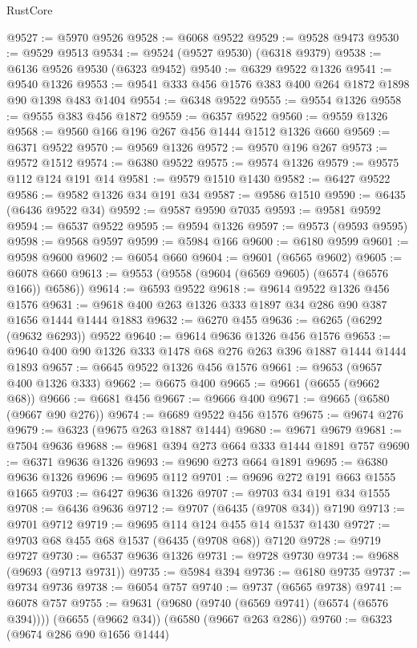 \begin{lexlean}{RustCore}
\begin{coremodule}
@9527 := @5970 @9526
@9528 := @6068 @9522
@9529 := @9528 @9473
@9530 := @9529 @9513
@9534 := @9524 (@9527 @9530) (@6318 @9379)
@9538 := @6136 @9526 @9530 (@6323 @9452)
@9540 := @6329 @9522 @1326
@9541 := @9540 @1326
@9553 := @9541 @333 @456 @1576 @383 @400 @264 @1872 @1898 @90 @1398 @483 @1404
@9554 := @6348 @9522
@9555 := @9554 @1326
@9558 := @9555 @383 @456 @1872
@9559 := @6357 @9522
@9560 := @9559 @1326
@9568 := @9560 @166 @196 @267 @456 @1444 @1512 @1326 @660
@9569 := @6371 @9522
@9570 := @9569 @1326
@9572 := @9570 @196 @267
@9573 := @9572 @1512
@9574 := @6380 @9522
@9575 := @9574 @1326
@9579 := @9575 @112 @124 @191 @14
@9581 := @9579 @1510 @1430
@9582 := @6427 @9522
@9586 := @9582 @1326 @34 @191 @34
@9587 := @9586 @1510
@9590 := @6435 (@6436 @9522 @34)
@9592 := @9587 @9590 @7035
@9593 := @9581 @9592
@9594 := @6537 @9522
@9595 := @9594 @1326
@9597 := @9573 (@9593 @9595)
@9598 := @9568 @9597
@9599 := @5984 @166
@9600 := @6180 @9599
@9601 := @9598 @9600
@9602 := @6054 @660
@9604 := @9601 (@6565 @9602)
@9605 := @6078 @660
@9613 := @9553 (@9558 (@9604 (@6569 @9605) (@6574 (@6576 @166)) @6586))
@9614 := @6593 @9522
@9618 := @9614 @9522 @1326 @456 @1576
@9631 := @9618 @400 @263 @1326 @333 @1897 @34 @286 @90 @387 @1656 @1444 @1444 @1883
@9632 := @6270 @455
@9636 := @6265 (@6292 (@9632 @6293)) @9522
@9640 := @9614 @9636 @1326 @456 @1576
@9653 := @9640 @400 @90 @1326 @333 @1478 @68 @276 @263 @396 @1887 @1444 @1444 @1893
@9657 := @6645 @9522 @1326 @456 @1576
@9661 := @9653 (@9657 @400 @1326 @333)
@9662 := @6675 @400
@9665 := @9661 (@6655 (@9662 @68))
@9666 := @6681 @456
@9667 := @9666 @400
@9671 := @9665 (@6580 (@9667 @90 @276))
@9674 := @6689 @9522 @456 @1576
@9675 := @9674 @276
@9679 := @6323 (@9675 @263 @1887 @1444)
@9680 := @9671 @9679
@9681 := @7504 @9636
@9688 := @9681 @394 @273 @664 @333 @1444 @1891 @757
@9690 := @6371 @9636 @1326
@9693 := @9690 @273 @664 @1891
@9695 := @6380 @9636 @1326
@9696 := @9695 @112
@9701 := @9696 @272 @191 @663 @1555 @1665
@9703 := @6427 @9636 @1326
@9707 := @9703 @34 @191 @34 @1555
@9708 := @6436 @9636
@9712 := @9707 (@6435 (@9708 @34)) @7190
@9713 := @9701 @9712
@9719 := @9695 @114 @124 @455 @14 @1537 @1430
@9727 := @9703 @68 @455 @68 @1537 (@6435 (@9708 @68)) @7120
@9728 := @9719 @9727
@9730 := @6537 @9636 @1326
@9731 := @9728 @9730
@9734 := @9688 (@9693 (@9713 @9731))
@9735 := @5984 @394
@9736 := @6180 @9735
@9737 := @9734 @9736
@9738 := @6054 @757
@9740 := @9737 (@6565 @9738)
@9741 := @6078 @757
@9755 := @9631
    (@9680 (@9740 (@6569 @9741) (@6574 (@6576 @394))))
    (@6655 (@9662 @34))
    (@6580 (@9667 @263 @286))
@9760 := @6323 (@9674 @286 @90 @1656 @1444)

\end{coremodule}
\end{lexlean}
